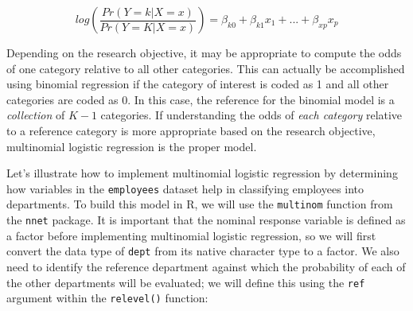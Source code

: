 \documentclass[
]{book}
\newenvironment{Shaded}{\begin{snugshade}}{\end{snugshade}}
\newcommand{\AttributeTok}[1]{\textcolor[rgb]{0.77,0.63,0.00}{#1}}
\newcommand{\CommentTok}[1]{\textcolor[rgb]{0.56,0.35,0.01}{\textit{#1}}}
\newcommand{\FunctionTok}[1]{\textcolor[rgb]{0.00,0.00,0.00}{#1}}
\newcommand{\NormalTok}[1]{#1}
\newcommand{\OtherTok}[1]{\textcolor[rgb]{0.56,0.35,0.01}{#1}}
\newcommand{\SpecialCharTok}[1]{\textcolor[rgb]{0.00,0.00,0.00}{#1}}
\newcommand{\StringTok}[1]{\textcolor[rgb]{0.31,0.60,0.02}{#1}}
\begin{document}
\[ log(\frac{Pr(Y = k | X = x)} {Pr(Y = K | X = x)}) = \beta_{k0} + \beta_{k1}x_1 + ... + \beta_{xp}x_p \]

Depending on the research objective, it may be appropriate to compute the odds of one category relative to all other categories. This can actually be accomplished using binomial regression if the category of interest is coded as 1 and all other categories are coded as 0. In this case, the reference for the binomial model is a \emph{collection} of \(K-1\) categories. If understanding the odds of \emph{each category} relative to a reference category is more appropriate based on the research objective, multinomial logistic regression is the proper model.

Let's illustrate how to implement multinomial logistic regression by determining how variables in the \texttt{employees} dataset help in classifying employees into departments. To build this model in R, we will use the \texttt{multinom} function from the \texttt{nnet} package. It is important that the nominal response variable is defined as a factor before implementing multinomial logistic regression, so we will first convert the data type of \texttt{dept} from its native character type to a factor. We also need to identify the reference department against which the probability of each of the other departments will be evaluated; we will define this using the \texttt{ref} argument within the \texttt{relevel()} function:

\begin{Shaded}
\end{Shaded}
\end{document}
